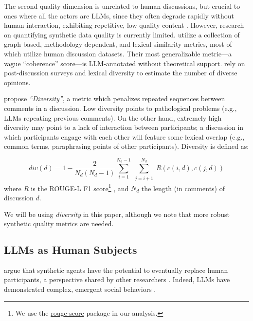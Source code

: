 The second quality dimension is unrelated to human discussions, but crucial to ones where all the actors are \acp{LLM}, since they often degrade rapidly without human interaction, exhibiting repetitive, low-quality content \citep{ulmer2024}. However, research on quantifying synthetic data quality is currently limited. \citet{balog_2024} utilize a collection of graph-based, methodology-dependent, and lexical similarity metrics, most of which utilize human discussion datasets. Their most generalizable metric—a vague ``coherence'' score—is \ac{LLM}-annotated without theoretical support. \citet{kim_et_al_chatbot} rely on post-discussion surveys and lexical diversity to estimate the number of diverse opinions. 

\citet{ulmer2024} propose \emph{``Diversity''}, a metric which penalizes repeated sequences between comments in a discussion. Low diversity points to pathological problems (e.g., \acp{LLM} repeating previous comments). On the other hand, extremely high diversity may point to a lack of interaction between participants; a discussion in which participants engage with each other will feature some lexical overlap (e.g., common terms, paraphrasing points of other participants). 
Diversity is defined as:

\small
\begin{equation}
	\label{eq:variety}
	\textit{div}(d) = 1 - \frac{2}{N_d(N_d-1)}
	\sum_{i=1}^{N_d-1} \sum_{\substack{j=i+1}}^{N_d} R(c(i,d), c(j,d))
\end{equation}
\normalsize
\noindent where \textit{R} is the ROUGE-L F1 score\footnote{We use the \href{https://pypi.org/project/rouge-score}{rouge-score} package in our analysis.} \cite{lin-2004-rouge}, and $N_d$ the length (in comments) of discussion $d$.

We will be using \emph{diversity} in this paper, although we note that more robust synthetic quality metrics are needed.


\subsection{LLMs as Human Subjects}
\label{ssec:related:human-llm}

\citet{grossman_2023} argue that synthetic agents have the potential to eventually replace human participants, a perspective shared by other researchers \cite{tornberg_2023, argyle2023}. Indeed, \acp{LLM} have demonstrated complex, emergent social behaviors \cite{Park2023GenerativeAI, demarzo_2023, leng_2024, abdelnabi_negotiations, abramski_2023, hewitt2024predicting, park2024generativeagentsimulations1000}.

